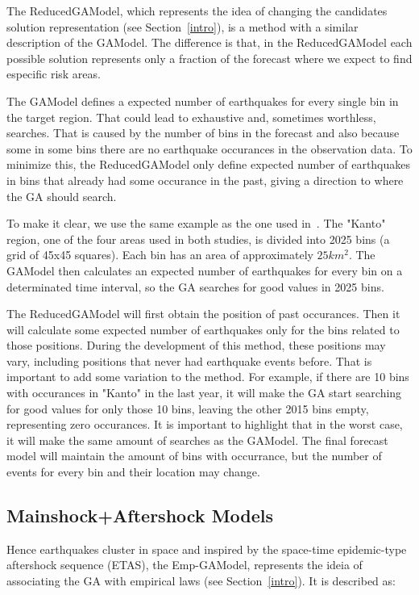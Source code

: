 
The ReducedGAModel, which represents the idea of changing the
candidates solution representation (see Section~\ref{intro}), is a
method with a similar description of the GAModel. The difference is
that, in the ReducedGAModel each possible solution represents only a
fraction of the forecast where we expect to find especific risk areas.

The GAModel defines a expected number of earthquakes for every single
bin in the target region. That could lead to exhaustive and, sometimes
worthless, searches. That is caused by the number of bins in the
forecast and also because some in some bins there are no earthquake
occurances in the observation data. To minimize this, the
ReducedGAModel only define expected number of earthquakes in bins that
already had some occurance in the past, giving a direction to where
the GA should search.

To make it clear, we use the same example as the one used
in~\cite{ecta14}. The "Kanto" region, one of the four areas used in
both studies, is divided into 2025 bins (a grid of 45x45
squares). Each bin has an area of approximately $25km^2$. The GAModel
then calculates an expected number of earthquakes for every bin on a
determinated time interval, so the GA searches for good values in 2025
bins.

The ReducedGAModel will first obtain the position of past
occurances. Then it will calculate some expected number of earthquakes
only for the bins related to those positions. During the development
of this method, these positions may vary, including positions that
never had earthquake events before. That is important to add some
variation to the method. For example, if there are 10 bins with
occurances in "Kanto" in the last year, it will make the GA start
searching for good values for only those 10 bins, leaving the other
2015 bins empty, representing zero occurances. It is important to
highlight that in the worst case, it will make the same amount of
searches as the GAModel. The final forecast model will maintain the
amount of bins with occurrance, but the number of events for every bin
and their location may change.


\subsection{Mainshock+Aftershock Models}
Hence earthquakes cluster in space and inspired by the space-time
epidemic-type aftershock sequence (ETAS), the Emp-GAModel, represents
the ideia of associating the GA with empirical laws (see
Section~\ref{intro}). It is described as:

